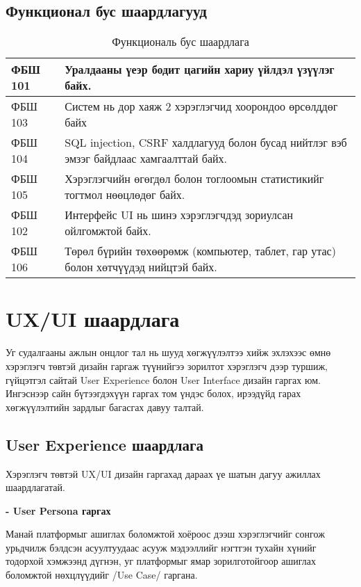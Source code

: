 \subsection{Функционал бус шаардлагууд}

\begin{table}[h]
	\centering
	\caption{Функциональ бус шаардлага}
	\begin{tabular}{ |p{2cm}|p{13cm}| }
		\hline
		ФБШ 101 & Уралдааны үеэр бодит цагийн хариу үйлдэл үзүүлэг байх.                                  \\ \hline
		ФБШ 103 & Систем нь дор хаяж 2 хэрэглэгчид хоорондоо өрсөлддөг байх                               \\ \hline
		ФБШ 104 & SQL injection, CSRF халдлагууд болон бусад нийтлэг вэб эмзэг байдлаас хамгаалттай байх. \\ \hline
		ФБШ 105 & Хэрэглэгчийн өгөгдөл болон тоглоомын статистикийг тогтмол нөөцлөдөг байх.               \\ \hline
		ФБШ 102 & Интерфейс UI нь шинэ хэрэглэгчдэд зориулсан ойлгомжтой байх.                            \\ \hline
		ФБШ 106 & Төрөл бүрийн төхөөрөмж (компьютер, таблет, гар утас) болон хөтчүүдэд нийцтэй байх.      \\  \hline
	\end{tabular}
\end{table}

\section{UX/UI шаардлага}

Уг судалгааны ажлын онцлог тал нь шууд хөгжүүлэлтээ хийж эхлэхээс өмнө хэрэглэгч төвтэй дизайн гаргаж түүнийгээ зорилтот хэрэглэгч дээр туршиж, гүйцэтгэл сайтай User Experience болон User Interface дизайн гаргах юм. Ингэснээр сайн бүтээгдэхүүн гаргах том үндэс болох, ирээдүйд гарах хөгжүүлэлтийн зардлыг багасгах давуу талтай.

\subsection{User Experience шаардлага}

Хэрэглэгч төвтэй UX/UI дизайн гаргахад дараах үе шатын дагуу ажиллах шаардлагатай.

\textbf{- User Persona гаргах}

Манай платформыг ашиглах боломжтой хоёроос дээш хэрэглэгчийг сонгож урьдчилж бэлдсэн асуултуудаас асууж мэдээллийг нэгтгэн тухайн хүнийг тодорхой хэмжээнд дүгнэн, уг платформыг ямар зорилготойгоор ашиглах боломжтой нөхцлүүдийг /Use Case/ гаргана.

